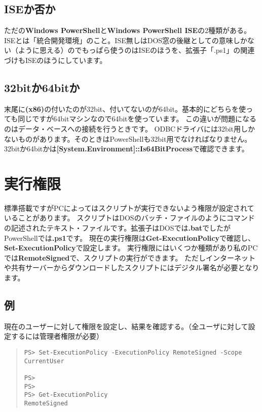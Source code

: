 \documentclass[dvipdfmx]{jsarticle}
\begin{document}
\subsection{ISEか否か}
ただの\textbf{Windows PowerShell}と\textbf{Windows PowerShell ISE}の2種類がある。
ISEとは「統合開発環境」のこと。ISE無しはDOS窓の後継としての意味しかない（ように思える）のでもっぱら使うのはISEのほうを、拡張子「.ps1」の関連づけもISEのほうにしています。

\subsection{32bitか64bitか}
末尾に\textbf{(x86)}の付いたのが32bit、付いてないのが64bit。基本的にどちらを使っても同じですが64bitマシンなので64bitを使っています。
この違いが問題になるのはデータ・ベースへの接続を行うときです。
ODBCドライバには32bit用しかないものがあります。そのときはPowerShellも32bit用でなければなりません。
32bitか64bitかは\textbf{[System.Environment]::Is64BitProcess}で確認できます。


\section{実行権限}
標準搭載ですがPCによってはスクリプトが実行できないよう権限が設定されていることがあります。
スクリプトはDOSのバッチ・ファイルのようにコマンドの記述されたテキスト・ファイルです。拡張子はDOSでは\textbf{.bat}でしたがPowerShellでは\textbf{.ps1}です。
現在の実行権限は\textbf{Get-ExecutionPolicy}で確認し、
\textbf{Set-ExecutionPolicy}で設定します。
実行権限にはいくつか種類があり私のPCでは\textbf{RemoteSigned}で、スクリプトの実行ができます。
ただしインターネットや共有サーバーからダウンロードしたスクリプトにはデジタル署名が必要となります。

\subsection{例}
現在のユーザーに対して権限を設定し、結果を確認する。（全ユーザに対して設定するには管理者権限が必要）

\begin{quote}
\begin{verbatim}
PS> Set-ExecutionPolicy -ExecutionPolicy RemoteSigned -Scope CurrentUser

PS> 
PS> 
PS> Get-ExecutionPolicy
RemoteSigned
\end{verbatim}
\end{quote}
\end{document}
